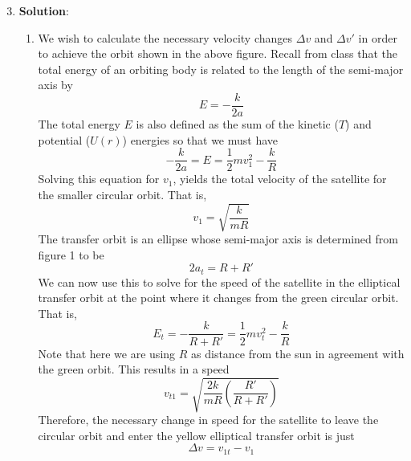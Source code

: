\documentclass[usletter, 12pt]{article}
\begin{document}
\begin{enumerate}[leftmargin=0em, label=\textbf{\arabic*}.]
  \setcounter{enumi}{2} %
  \item \textbf{Solution}:\\
    \begin{enumerate}[leftmargin=2em, label=(\textbf{\alph*})]
    \item We wish to calculate the necessary velocity changes $\Delta v$ and
      $\Delta v'$ in order to achieve the orbit shown in the above figure.
      Recall from class that the total energy of an orbiting body is related to
      the length of the semi-major axis by
      \begin{equation}
        E = -\frac{k}{2a}
      \end{equation}
      The total energy $E$ is also defined as the sum of the kinetic ($T$) and
      potential ($U(r)$) energies so that we must have
      \begin{equation}
        -\frac{k}{2a} = E = \frac{1}{2}mv_1^2-\frac{k}{R}
      \end{equation}
      Solving this equation for $v_1$, yields the total velocity of the
      satellite for the smaller circular orbit. That is,
      \begin{equation}
        v_1 = \sqrt{\frac{k}{mR}}
      \end{equation}
      The transfer orbit is an ellipse whose semi-major axis is determined from
      figure 1 to be
      \begin{equation}
        2a_t = R+R'
      \end{equation}
      We can now use this to solve for the speed of the satellite in the
      elliptical transfer orbit at the point where it changes from the green
      circular orbit. That is,
      \begin{equation}
        E_t = -\frac{k}{R+R'}= \frac{1}{2}m v_t^2-\frac{k}{R}
      \end{equation}
      Note that here we are using $R$ as distance from the sun in agreement
      with the green orbit. This results in a speed
      \begin{equation}
        v_{t1}=\sqrt{\frac{2k}{mR}\left( \frac{R'}{R+R'} \right)}
      \end{equation}
      Therefore, the necessary change in speed for the satellite to leave the
      circular orbit and enter the yellow elliptical transfer orbit is just 
      \begin{equation}
        \Delta v = v_{1t}-v_1
      \end{equation}


\end{enumerate}
\end{enumerate}
\end{document}
